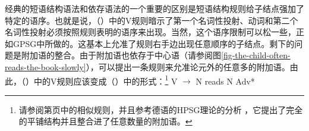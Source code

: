 经典的短语结构语法和依存语法的一个重要的区别是短语结构规则给子结点强加了特定的语序。也就是说，（）中的V规则暗示了第一个名词性投射、动词和第二个名词性投射必须按照规则表明的语序来出现。当然，这个语序限制可以松一些，正如GPSG中所做的。这基本上允准了规则右手边出现任意顺序的子结点。剩下的问题是附加语的整合。由于附加语也依存于中心语（请参阅图\vref{fig-the-child-often-reads-the-book-slowly}），可以提出一条规则来允准论元外的任意多的附加语。由此，（）中的V规则应该变成（）中的形式：\footnote{%
请参阅第\pageref{adv-metarule}页中\gpsgc 的相似规则，并且参考德语的HPSG理论的分析 \citet{Kasper94a}，它提出了完全的平铺结构并且整合进了任意数量的附加语。
}
\ea
V $\to$ N reads N Adv*
\z 

